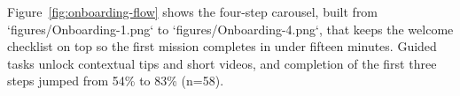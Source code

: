 Figure~\ref{fig:onboarding-flow} shows the four-step carousel, built from `figures/Onboarding-1.png` to `figures/Onboarding-4.png`, that keeps the welcome checklist on top so the first mission completes in under fifteen minutes. Guided tasks unlock contextual tips and short videos, and completion of the first three steps jumped from 54\% to 83\% (n=58).

\begin{figure}[H]
  \centering
\end{figure}
